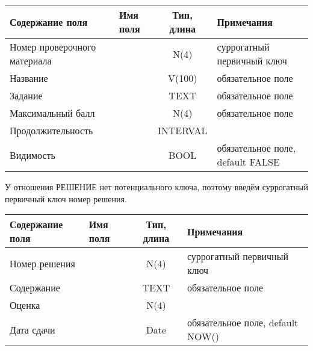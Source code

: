 \documentclass[a4paper,14pt]{article}
\begin{document}
\begin{table}[H]
	\begin{adjustbox}{width=\linewidth}
	\begin{tabular}{|l|l|c|l|}
		\hline
		Содержание поля              & Имя поля & Тип, длина & Примечания                       \\ \hline
		Номер проверочного материала &          &    N(4)    & суррогатный первичный ключ       \\ \hline
		Название                     &          &   V(100)   & обязательное поле                \\ \hline
		Задание                      &          &    TEXT    & обязательное поле                \\ \hline
		Максимальный балл            &          &    N(4)    & обязательное поле                \\ \hline
		Продолжительность            &          &  INTERVAL  &                                  \\ \hline
		Видимость                    &          &    BOOL    & обязательное поле, default FALSE \\ \hline
	\end{tabular}
\end{adjustbox}
\end{table}


У отношения РЕШЕНИЕ нет потенциального ключа, поэтому введём суррогатный первичный ключ номер решения.

\begin{table}[H]
	\begin{tabular}{|l|l|c|l|}
		\hline
		Содержание поля & Имя поля & Тип, длина & Примечания                       \\ \hline
		Номер решения   &          &    N(4)    & суррогатный первичный ключ       \\ \hline
		Содержание      &          &    TEXT    & обязательное поле                \\ \hline
		Оценка          &          &    N(4)    &                                  \\ \hline
		Дата сдачи      &          &    Date    & обязательное поле, default NOW() \\ \hline
	\end{tabular}
\end{table}


%	
\end{document}
